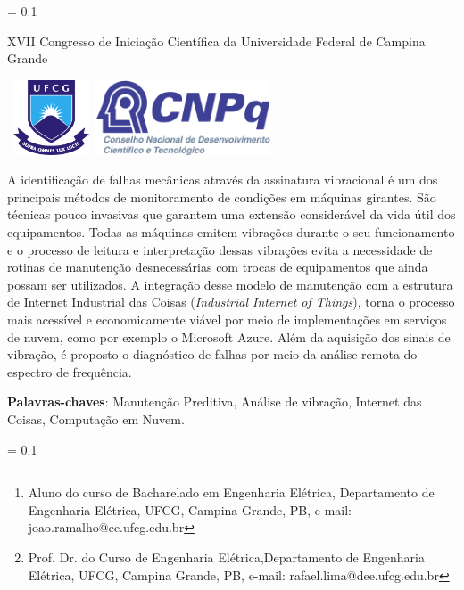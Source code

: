 \documentclass[
	article,			%
	12pt,				%
	oneside,			%
	a4paper,			%
	section=TITLE,		%
	subsection=TITLE,	%
	english,			%
	brazil,				%
	sumario=tradicional
	]{abntex2}
\author{
João Victor Rodrigues Ramalho
\thanks{Aluno do curso de Bacharelado em Engenharia Elétrica, Departamento de Engenharia Elétrica, UFCG, Campina Grande, PB, e-mail: joao.ramalho@ee.ufcg.edu.br}, 
Rafael Bezerra Correia Lima
\thanks{Prof. Dr. do Curso de Engenharia Elétrica,Departamento de Engenharia Elétrica, UFCG, Campina Grande, PB, e-mail: rafael.lima@dee.ufcg.edu.br}
}
\makeatletter
\newlength\drop
\newcommand*{\titleIC}{%
\thispagestyle{empty}
\begingroup%
\drop = 0.1\textheight
\vspace*{-3cm}
\begin{center}
XVII Congresso de Iniciação Científica da Universidade Federal de Campina Grande    
\end{center}
\hbox{
\includegraphics[width=2.25cm,height=2.22cm]{ufcg.png}
\hspace*{0.55\textwidth}
\includegraphics[width=4.cm,height=2.22cm]{cnpq.png}
}
\begin{center}
 \normalfont\fontsize{12}{15}\bfseries\@title\par  
\end{center}
\vspace{5pt}
\begin{flushright}
\normalfont\fontsize{10}{15}\bfseries\@author\par
\end{flushright}
\vspace{5pt}
\thispagestyle{empty}\@thanks
\endgroup
}
\newcommand*{\titleICpagII}{%
\thispagestyle{empty}
\begingroup%
\drop = 0.1\textheight
\begin{center}
 \normalfont\fontsize{12}{15}\bfseries\@title\par  
\end{center}
\vspace{48pt}
}
\makeatother
\begin{document}
\frenchspacing 


%
%
\titleIC

\begin{resumo}
A identificação de falhas mecânicas através da assinatura vibracional é um dos principais métodos de monitoramento de condições em máquinas girantes. São técnicas pouco invasivas que garantem uma extensão considerável da vida útil dos equipamentos. Todas as máquinas emitem vibrações durante o seu funcionamento e o processo de leitura e interpretação dessas vibrações evita a necessidade de rotinas de manutenção desnecessárias com trocas de equipamentos que ainda possam ser utilizados. A integração desse modelo de manutenção com a estrutura de Internet Industrial das Coisas (\textit{Industrial Internet of Things}), torna o processo mais acessível e economicamente viável por meio de implementações em serviços de nuvem, como por exemplo o Microsoft Azure. Além da aquisição dos sinais de vibração, é proposto o diagnóstico de falhas por meio da análise remota do espectro de frequência.

 \vspace{\onelineskip}
 \noindent
 \textbf{Palavras-chaves}: Manutenção Preditiva, Análise de vibração, Internet das Coisas, Computação em Nuvem.
\end{resumo}




\newpage
\titleICpagII
\end{document}
